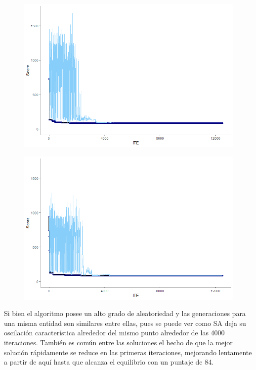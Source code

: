\begin{figure}[H]
	\centering
	\captionsetup{justification=centering}
	\includegraphics[scale=0.65]{images/marine2.png}
	\label{fig:11}
\end{figure}

\begin{figure}[H]
	\centering
	\captionsetup{justification=centering}
	\includegraphics[scale=0.65]{images/marine3.png}
	\label{fig:12}
\end{figure}

Si bien el algoritmo posee un alto grado de aleatoriedad y las generaciones para una misma entidad son similares entre ellas, pues se puede ver como SA deja su oscilación característica alrededor del mismo punto alrededor de las 4000 iteraciones. También es común entre las soluciones el hecho de que la mejor solución rápidamente se reduce en las primeras iteraciones, mejorando lentamente a partir de aquí hasta que alcanza el equilibrio con un puntaje de 84.

